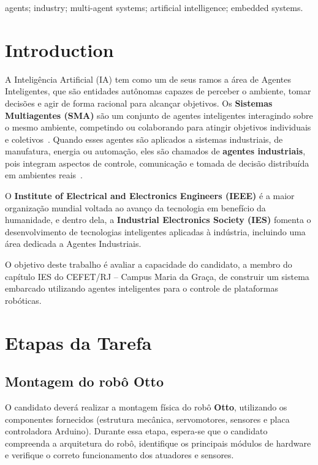 \documentclass{ieeeojies}
\begin{document}
\begin{keywords}
agents; industry; multi-agent systems; artificial intelligence; embedded systems.
\end{keywords}

\titlepgskip=-15pt

\maketitle

\section{Introduction}
\label{sec:introduction}
A Inteligência Artificial (IA) tem como um de seus ramos a área de Agentes Inteligentes, que são entidades autônomas capazes de perceber o ambiente, tomar decisões e agir de forma racional para alcançar objetivos. Os \textbf{Sistemas Multiagentes (SMA)} são um conjunto de agentes inteligentes interagindo sobre o mesmo ambiente, competindo ou colaborando para atingir objetivos individuais e coletivos~\cite{Wooldridge2009}. Quando esses agentes são aplicados a sistemas industriais, de manufatura, energia ou automação, eles são chamados de \textbf{agentes industriais}, pois integram aspectos de controle, comunicação e tomada de decisão distribuída em ambientes reais~\cite{LeitaoKarnouskos2016}.

O \textbf{Institute of Electrical and Electronics Engineers (IEEE)} é a maior organização mundial voltada ao avanço da tecnologia em benefício da humanidade, e dentro dela, a \textbf{Industrial Electronics Society (IES)} fomenta o desenvolvimento de tecnologias inteligentes aplicadas à indústria, incluindo uma área dedicada a Agentes Industriais.

O objetivo deste trabalho é avaliar a capacidade do candidato, a membro do capítulo IES do CEFET/RJ – Campus Maria da Graça, de construir um sistema embarcado utilizando agentes inteligentes para o controle de plataformas robóticas. 

\section{Etapas da Tarefa}

\subsection{Montagem do robô Otto}

O candidato deverá realizar a montagem física do robô \textbf{Otto}, utilizando os componentes fornecidos (estrutura mecânica, servomotores, sensores e placa controladora Arduino). Durante essa etapa, espera-se que o candidato compreenda a arquitetura do robô, identifique os principais módulos de hardware e verifique o correto funcionamento dos atuadores e sensores.
\end{document}
